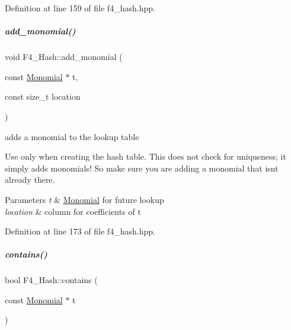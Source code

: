 Definition at line 159 of file f4\+\_\+hash.\+hpp.

\mbox{\label{group___g_b_computation_a86a18244162325e3d792ea39525b23f8}} 
\subparagraph{\texorpdfstring{add\+\_\+monomial()}{add\_monomial()}\hspace{0.1cm}{\footnotesize\ttfamily [2/2]}}
{\footnotesize\ttfamily void F4\+\_\+\+Hash\+::add\+\_\+monomial (\begin{DoxyParamCaption}\item[{const \hyperlink{group__polygroup_class_monomial}{Monomial} $\ast$}]{t,  }\item[{const size\+\_\+t}]{location }\end{DoxyParamCaption})\hspace{0.3cm}{\ttfamily [inline]}}



adds a monomial to the lookup table 

Use only when creating the hash table. This does not check for uniqueness; it simply adds monomials! So make sure you are adding a monomial that isn\textquotesingle{}t already there. 
\begin{DoxyParams}{Parameters}
{\em t} & {\ttfamily \hyperlink{group__polygroup_class_monomial}{Monomial}} for future lookup \\
\hline
{\em location} & column for coefficients of {\ttfamily t} \\
\hline
\end{DoxyParams}


Definition at line 173 of file f4\+\_\+hash.\+hpp.

\mbox{\label{group___g_b_computation_af4191f4fd7b43859efe6b30e4f702cb7}} 
\subparagraph{\texorpdfstring{contains()}{contains()}}
{\footnotesize\ttfamily bool F4\+\_\+\+Hash\+::contains (\begin{DoxyParamCaption}\item[{const \hyperlink{group__polygroup_class_monomial}{Monomial} $\ast$}]{t }\end{DoxyParamCaption})\hspace{0.3cm}{\ttfamily [inline]}}



